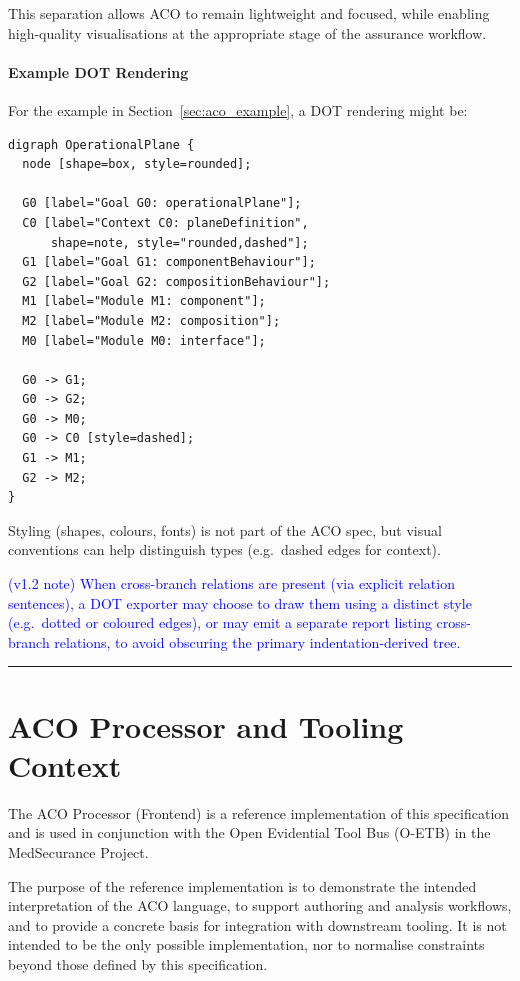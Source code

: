 \documentclass[11pt]{article}
\begin{document}
This separation allows ACO to remain lightweight and focused, while enabling
high-quality visualisations at the appropriate stage of the assurance workflow.

\paragraph*{Example DOT Rendering}

For the example in Section~\ref{sec:aco_example}, a DOT rendering might be:

\begin{verbatim}
digraph OperationalPlane {
  node [shape=box, style=rounded];

  G0 [label="Goal G0: operationalPlane"];
  C0 [label="Context C0: planeDefinition",
      shape=note, style="rounded,dashed"];
  G1 [label="Goal G1: componentBehaviour"];
  G2 [label="Goal G2: compositionBehaviour"];
  M1 [label="Module M1: component"];
  M2 [label="Module M2: composition"];
  M0 [label="Module M0: interface"];

  G0 -> G1;
  G0 -> G2;
  G0 -> M0;
  G0 -> C0 [style=dashed];
  G1 -> M1;
  G2 -> M2;
}
\end{verbatim}

Styling (shapes, colours, fonts) is not part of the ACO spec, but visual conventions can help distinguish types (e.g.\ dashed edges for context).

\textcolor{blue}{(v1.2 note) When cross-branch relations are present (via explicit relation sentences), a DOT exporter may choose to draw them using a distinct style (e.g.\ dotted or coloured edges), or may emit a separate report listing cross-branch relations, to avoid obscuring the primary indentation-derived tree.}

\bigskip
\hrule
\bigskip



\section{ACO Processor and Tooling Context}
\label{sec:frontend}

The ACO Processor (Frontend) is a reference implementation of this specification and is used in
conjunction with the Open Evidential Tool Bus (O-ETB) in the MedSecurance Project.

The purpose of the reference implementation is to demonstrate the intended interpretation
of the ACO language, to support authoring and analysis workflows, and to provide a
concrete basis for integration with downstream tooling. It is not intended to be the
only possible implementation, nor to normalise constraints beyond those defined by this
specification.
\end{document}
